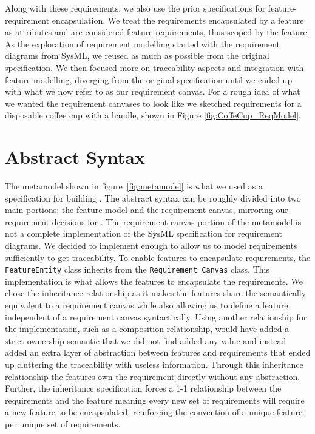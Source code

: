 Along with these requirements, we also use the prior specifications for feature-requirement encapsulation. We treat the requirements encapsulated by a feature as attributes and are considered feature requirements, thus scoped by the feature. As the exploration of requirement modelling started with the requirement diagrams from SysML, we reused as much as possible from the original specification. We then focused more on traceability aspects and integration with feature modelling, diverging from the original specification until we ended up with what we now refer to as our requirement canvas. For a rough idea of what we wanted the requirement canvases to look like we sketched requirements for a disposable coffee cup with a handle, shown in Figure \ref{fig:CoffeCup_ReqModel}.


%
%

\section{Abstract Syntax}
\label{sec:Abstract_Syntax}

The metamodel shown in figure~\ref{fig:metamodel} is what we used as a specification for building \tool. The abstract syntax can be roughly divided into two main portions; the feature model and the requirement canvas, mirroring our requirement decisions for \tool. The requirement canvas portion of the metamodel is not a complete implementation of the SysML specification for requirement diagrams. We decided to implement enough to allow us to model requirements sufficiently to get traceability. To enable features to encapsulate requirements, the \texttt{FeatureEntity} class inherits from the \texttt{Requirement\_Canvas} class. This implementation is what allows the features to encapsulate the requirements. We chose the inheritance relationship as it makes the features share the semantically equivalent to a requirement canvas while also allowing us to define a feature independent of a requirement canvas syntactically. Using another relationship for the implementation, such as a composition relationship, would have added a strict ownership semantic that we did not find added any value and instead added an extra layer of abstraction between features and requirements that ended up cluttering the traceability with useless information. Through this inheritance relationship the features own the requirement directly without any abstraction. Further, the inheritance specification forces a 1-1 relationship between the requirements and the feature meaning every new set of requirements will require a new feature to be encapsulated, reinforcing the convention of a unique feature per unique set of requirements.

